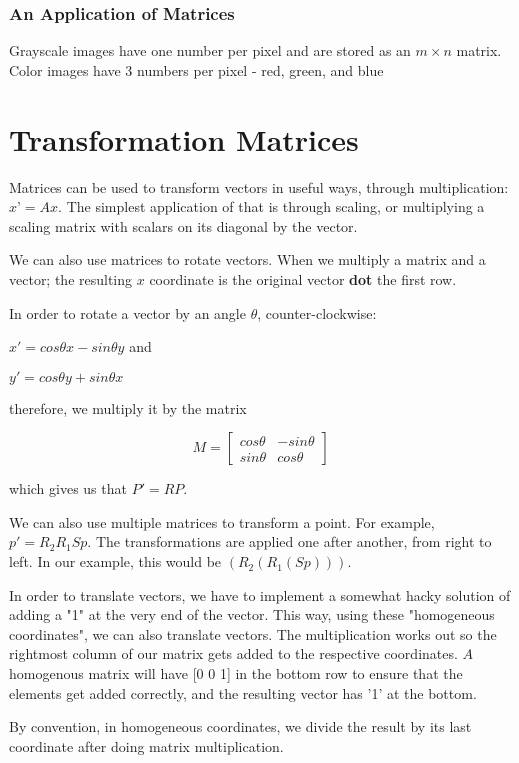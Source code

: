 \documentclass{article}
\begin{document}
\subsubsection{An Application of Matrices}
Grayscale images have one number per pixel and are stored as an $m\times n$ matrix. Color images have 3 numbers per pixel - red, green, and blue \section{Transformation Matrices}
Matrices can be	used to transform vectors in useful ways, through multiplication:
$x’= Ax$. The simplest application of that is through scaling, or multiplying a scaling matrix with scalars on its diagonal by the vector.

We can also use matrices to rotate vectors. When we multiply a matrix and a vector; the resulting $x$ coordinate is the original vector \textbf{dot} the first row.


In order to rotate a vector by an angle $\theta$, counter-clockwise:

$x'= cos\theta x -sin \theta y$ and

$y'= cos\theta y +sin \theta x$

therefore, we multiply it by the matrix

\[
M=
  \begin{bmatrix}
    cos\theta & -sin\theta \\
    sin\theta & cos\theta
  \end{bmatrix}
\]

which gives us that $P'= R P$.

We can also use multiple matrices to transform a point. For example, $p' = R_2 R_1 S p$. The transformations are applied one after another, from right to left. In our example, this would be $(R_2(R_1(S p)))$.

In order to translate vectors, we have to implement a somewhat hacky solution of adding a "1" at the very end of the vector. This way, using these "homogeneous coordinates", we can also translate vectors. The multiplication works out so the rightmost column of our matrix gets added to the respective coordinates. $A$ homogenous matrix will have [0 0 1] in the bottom row to ensure that the elements get added correctly, and the resulting vector has '1' at the bottom.

By convention, in homogeneous coordinates, we divide the result by its last coordinate after doing matrix multiplication.
\end{document}

